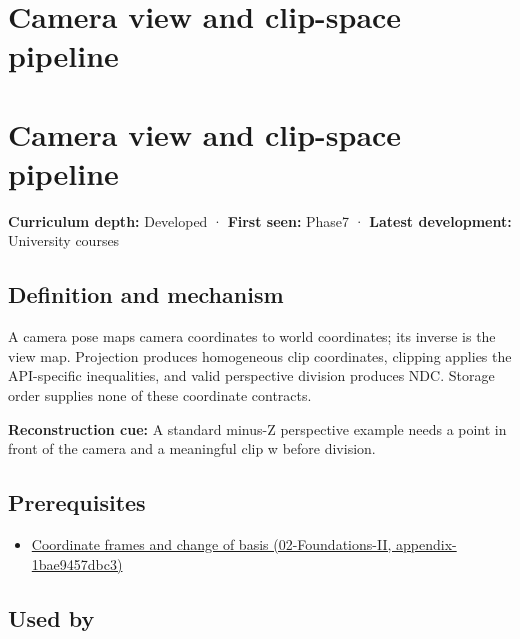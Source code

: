 \hypertarget{appendix-1c07d64f5e70}{}
\section*{Camera view and clip-space pipeline}
\section{Camera view and clip-space pipeline}\label{camera-view-and-clip-space-pipeline}

\textbf{Curriculum depth:} Developed · \textbf{First seen:} Phase7 · \textbf{Latest development:} University courses

\subsection{Definition and mechanism}\label{definition-and-mechanism}

A camera pose maps camera coordinates to world coordinates; its inverse is the view map. Projection produces homogeneous clip coordinates, clipping applies the API-specific inequalities, and valid perspective division produces NDC. Storage order supplies none of these coordinate contracts.

\textbf{Reconstruction cue:} A standard minus-Z perspective example needs a point in front of the camera and a meaningful clip w before division.

\subsection{Prerequisites}\label{prerequisites}

\begin{itemize}
\tightlist
\item
  \href{}{Coordinate frames and change of basis (02-Foundations-II, appendix-1bae9457dbc3)}
\end{itemize}

\subsection{Used by}\label{used-by}

